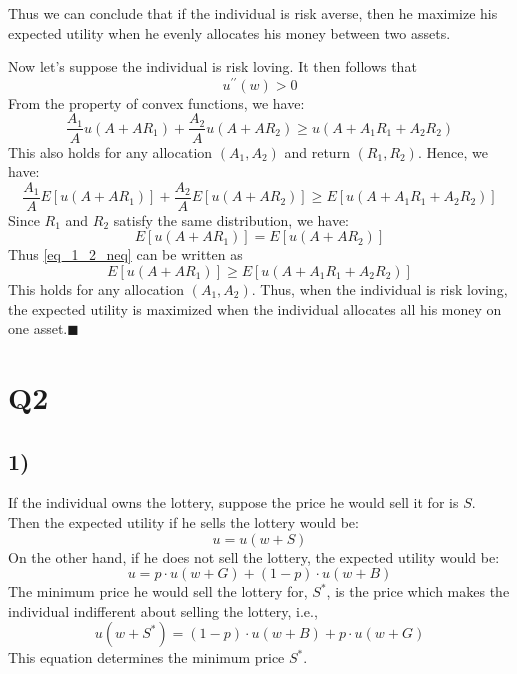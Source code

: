 \documentclass{article}
\begin{document}
 Thus we can conclude that if the individual is risk averse, then he maximize his expected utility when he evenly allocates his money between two assets.
\par
Now let's suppose the individual is risk loving. It then follows that
\begin{equation}
	u^{\prime\prime}(w) > 0
\end{equation}
From the property of convex functions, we have:
\begin{equation}
	\frac{A_1}{A}u(A+A R_1) + \frac{A_2}{A}u(A+A R_2) \geq u(A+A_1 R_1 + A_2 R_2)
\end{equation}
This also holds for any allocation $(A_1, A_2)$ and return $(R_1, R_2)$. Hence, we have:
\begin{equation}
	\label{eq_1_2_neq}
	\frac{A_1}{A}E\left[ u(A+A R_1) \right] + \frac{A_2}{A} E \left[ u(A+A R_2) \right] \geq E \left[ u(A+A_1 R_1 + A_2 R_2) \right]
\end{equation}
Since $R_1$ and $R_2$ satisfy the same distribution, we have:
\begin{equation}
	E\left[ u(A+A R_1) \right] = E \left[ u(A+A R_2) \right]
\end{equation}
Thus \eqref{eq_1_2_neq} can be written as
\begin{equation}
	E\left[ u(A+A R_1) \right] \geq E \left[ u(A+A_1 R_1 + A_2 R_2) \right]
\end{equation}
This holds for any allocation $(A_1, A_2)$. Thus, when the individual is risk loving, the expected utility is maximized when the individual allocates all his money on one asset.$\blacksquare$

\section*{Q2}
\subsection*{1)}
If the individual owns the lottery, suppose the price he would sell it for is $S$. Then the expected utility if he sells the lottery would be:
	\begin{equation}
		u = u (w+S)
	\end{equation}
	On the other hand, if he does not sell the lottery, the expected utility would be:
	\begin{equation}
		u = p \cdot u(w+G) + (1-p) \cdot u(w+B)
	\end{equation}
	The minimum price he would sell the lottery for, $S^{*}$, is the price which makes the individual indifferent about selling the lottery, i.e.,
	\begin{equation}
		\label{eq_2_1_main}
		u\left(w+S^*\right)=(1-p)\cdot u(w+B)+p\cdot u(w+G)
	\end{equation}
	This equation determines the minimum price $S^{*}$.
\end{document}
